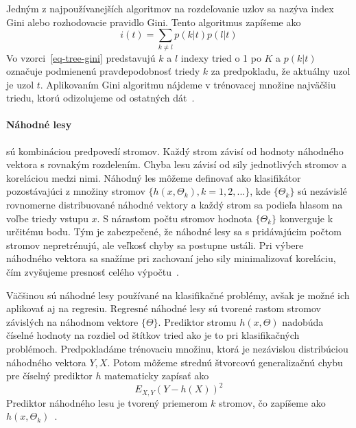 \documentclass[a4paper,slovak,12pt,appendix]{article}
\begin{document}
Jedným z najpoužívanejších algoritmov na rozdeľovanie uzlov sa nazýva index
Gini alebo rozhodovacie pravidlo Gini. Tento algoritmus zapíšeme ako
\begin{equation}
  i(t) = \sum_{k \neq l} p(k|t) p(l|t)
  \label{eq-tree-gini}
\end{equation}
Vo vzorci~\ref{eq-tree-gini} predstavujú $k$ a $l$ indexy tried o 1 po $K$ a
$p(k|t)$ označuje podmienenú pravdepodobnosť triedy $k$ za predpokladu, že
aktuálny uzol je uzol $t$. Aplikovaním Gini algoritmu nájdeme v trénovacej
množine najväčšiu triedu, ktorú odizolujeme od ostatných dát~\cite{Bel2009}.


\paragraph{Náhodné lesy} sú kombináciou predpovedí stromov. Každý strom závisí
od hodnoty náhodného vektora s rovnakým rozdelením. Chyba lesu závisí od sily
jednotlivých stromov a koreláciou medzi nimi. Náhodný les môžeme definovať ako
klasifikátor pozostávajúci z množiny stromov $\{h(x, \Theta_k), k=1, 2, ... \}$,
kde $\{\Theta_k\}$ sú nezávislé rovnomerne distribuované náhodné vektory a každý
strom sa podieľa hlasom na voľbe triedy vstupu $x$. S nárastom počtu stromov
hodnota $\{\Theta_k\}$ konverguje k určitému bodu. Tým je zabezpečené, že
náhodné lesy sa s pridávajúcim počtom stromov nepretrénujú, ale veľkosť chyby
sa postupne ustáli. Pri výbere náhodného vektora sa snažíme pri zachovaní jeho
sily minimalizovať koreláciu, čím zvyšujeme presnosť celého
výpočtu~\cite{Breiman2001}.

Väčšinou sú náhodné lesy používané na klasifikačné problémy, avšak je možné ich
aplikovať aj na regresiu. Regresné náhodné lesy sú tvorené rastom stromov
závislých na náhodnom vektore $\{\Theta\}$. Prediktor stromu $h(x, \Theta)$
nadobúda číselné hodnoty na rozdiel od štítkov tried ako je to pri klasifikačných
problémoch. Predpokladáme trénovaciu množinu, ktorá je nezávislou distribúciou
náhodného vektora $Y, X$. Potom môžeme strednú štvorcovú generalizačnú chybu
pre číselný prediktor $h$ matematicky zapísať ako
\begin{equation}
  E_{X, Y} (Y - h(X))^2
  \label{eq-random-error}
\end{equation}
Prediktor náhodného lesu je tvorený priemerom $k$ stromov, čo zapíšeme ako
$h(x, \Theta_k)$~\cite{Breiman2001}.
\end{document}
